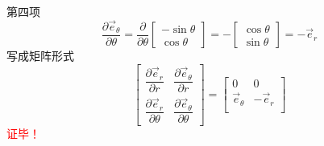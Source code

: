 	第四项
	$$
	\dfrac{\partial \vec{e}_{\theta}}{\partial \theta}  = \dfrac{\partial }{\partial \theta} \left[\begin{array}{ccc}
		-\sin \theta  \\
		\cos\theta 
	\end{array}\right] = - \left[\begin{array}{ccc}
		\cos \theta  \\
		\sin \theta 
	\end{array}\right]= -\vec{e}_{r}
	$$ 
	写成矩阵形式
	$$\left[\begin{array}{ccc}
		\dfrac{\partial \vec{e}_{r}}{\partial r} &   \dfrac{\partial \vec{e}_{\theta}}{\partial r} \\ 
		\dfrac{\partial \vec{e}_{r}}{\partial \theta} &  \dfrac{\partial \vec{e}_{\theta}}{\partial \theta} 
	\end{array}\right]
	= \left[\begin{array}{ccc}
		0 &  0 \\ 
		\vec{e}_{\theta} & -\vec{e}_{r} \\ 
	\end{array}\right]
	$$
	\textcolor{red}{证毕！}
  

